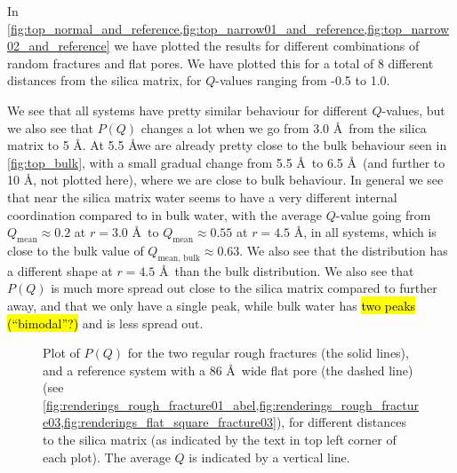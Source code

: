 In \cref{fig:top_normal_and_reference,fig:top_narrow01_and_reference,fig:top_narrow02_and_reference} we have plotted the results for different combinations of random fractures and flat pores. We have plotted this for a total of %
8 %
different distances from the silica matrix, for $Q$-values ranging from -0.5 to 1.0. 

We see that all systems have pretty similar behaviour for different $Q$-values, but we also see that $P(Q)$ changes a lot when we go from 3.0 \AA\ from the silica matrix to 5 \AA. At 5.5 \AA we are already pretty close to the bulk behaviour seen in \cref{fig:top_bulk}, with a small gradual change from 5.5 \AA\ to 6.5 \AA\ (and further to 10 \AA, not plotted here), where we are close to bulk behaviour. In general we see that near the silica matrix water seems to have a very different internal coordination compared to in bulk water, with the average $Q$-value going from $Q_\text{mean} \approx 0.2$ at $r = 3.0$ \AA\ to $Q_\text{mean} \approx 0.55$ at $r = 4.5$ \AA, in all systems, which is close to the bulk value of $Q_\text{mean, bulk} \approx 0.63$. We also see that the distribution has a different shape at $r = 4.5$ \AA\ than the bulk distribution. We also see that $P(Q)$ is much more spread out close to the silica matrix compared to further away, and that we only have a single peak, while bulk water has \hl{two peaks (``bimodal''?)} and is less spread out.

%
\begin{figure}[!p]%
    \centering%
    {%
        \captionsetup{width=\textwidth}%
        \caption{%
            Plot of $P(Q)$ for the two regular rough fractures (the solid lines), and a reference system with a 86 \AA\ wide flat pore (the dashed line) (see \cref{fig:renderings_rough_fracture01_abel,fig:renderings_rough_fracture03,fig:renderings_flat_square_fracture03}), for different distances to the silica matrix (as indicated by the text in top left corner of each plot). The average $Q$ is indicated by a vertical line. %
            \label{fig:top_normal_and_reference}%
        }%
    }%
\end{figure}%

